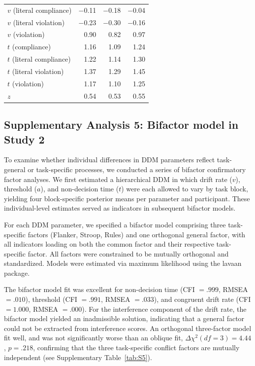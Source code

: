 \documentclass[pdflatex,sn-nature]{sn-jnl}
\begin{document}
\begin{appendices}
\begin{table}[htbp]
\begin{tabular*}{\textwidth}{@{\extracolsep{\fill}}lrrr@{}}
$v$ (literal compliance) & $-$0.11 & $-$0.18 & $-$0.04 \\
$v$ (literal violation)  & $-$0.23 & $-$0.30 & $-$0.16 \\
$v$ (violation)          & 0.90  & 0.82  & 0.97  \\
$t$ (compliance)         & 1.16  & 1.09  & 1.24  \\
$t$ (literal compliance) & 1.22  & 1.14  & 1.30  \\
$t$ (literal violation)  & 1.37  & 1.29  & 1.45  \\
$t$ (violation)          & 1.17  & 1.10  & 1.25  \\
$z$                      & 0.54  & 0.53  & 0.55  \\
\bottomrule
\end{tabular*}
\end{table}

\clearpage

\FloatBarrier

\subsection*{Supplementary Analysis 5: Bifactor model in Study 2}
\label{supp:analysis5}

To examine whether individual differences in DDM parameters reflect task-general or task-specific processes, we conducted a series of bifactor confirmatory factor analyses. We first estimated a hierarchical DDM in which drift rate ($v$), threshold ($a$), and non-decision time ($t$) were each allowed to vary by task block, yielding four block-specific posterior means per parameter and participant. These individual-level estimates served as indicators in subsequent bifactor models.

For each DDM parameter, we specified a bifactor model comprising three task-specific factors (Flanker, Stroop, Rules) and one orthogonal general factor, with all indicators loading on both the common factor and their respective task-specific factor. All factors were constrained to be mutually orthogonal and standardized. Models were estimated via maximum likelihood using the lavaan package.

The bifactor model fit was excellent for non-decision time (CFI $= .999$, RMSEA $= .010$), threshold (CFI $= .991$, RMSEA $= .033$), and congruent drift rate (CFI $= 1.000$, RMSEA $= .000$). For the interference component of the drift rate, the bifactor model yielded an inadmissible solution, indicating that a general factor could not be extracted from interference scores. An orthogonal three-factor model fit well, and was not significantly worse than an oblique fit, $\Delta\chi^2(\mathit{df} = 3) = 4.44$, $p = .218$, confirming that the three task-specific conflict factors are mutually independent (see Supplementary Table~\ref{tab:S5}).


\end{appendices}
\end{document}
